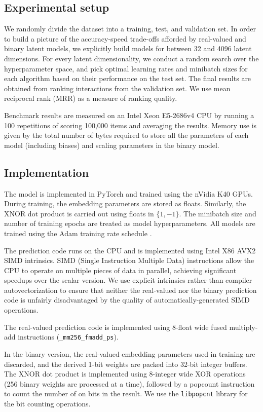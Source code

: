 \documentclass[sigchi]{acmart}
\begin{document}
\subsection{Experimental setup}
We randomly divide the dataset into a training, test, and validation set. In order to build a picture of the accuracy-speed trade-offs afforded by real-valued and binary latent models, we explicitly build models for between 32 and 4096 latent dimensions. For every latent dimensionality, we conduct a random search over the hyperparameter space, and pick optimal learning rates and minibatch sizes for each algorithm based on their performance on the test set. The final results are obtained from ranking interactions from the validation set. We use mean reciprocal rank (MRR) as a measure of ranking quality.

Benchmark results are measured on an Intel Xeon E5-2686v4 CPU by running a 100 repetitions of scoring 100,000 items and averaging the results. Memory use is given by the total number of bytes required to store all the parameters of each model (including biases) and scaling parameters in the binary model.

\subsection{Implementation}
The model is implemented in PyTorch and trained using the nVidia K40 GPUs. During training, the embedding parameters are stored as floats. Similarly, the XNOR dot product is carried out using floats in $\{1, -1\}$. The minibatch size and number of training epochs are treated as model hyperparameters. All models are trained using the Adam training rate schedule \citep{kingma2014adam}. 

The prediction code runs on the CPU and is implemented using Intel X86 AVX2 SIMD intrinsics. SIMD (Single Instruction Multiple Data) instructions allow the CPU to operate on multiple pieces of data in parallel, achieving significant speedups over the scalar version. We use explicit intrinsics rather than compiler autovectorization to ensure that neither the real-valued nor the binary prediction code is unfairly disadvantaged by the quality of automatically-generated SIMD operations.

The real-valued prediction code is implemented using 8-float wide fused multiply-add instructions (\texttt{\_mm256\_fmadd\_ps}).

In the binary version, the real-valued embedding parameters used in training are discarded, and the derived 1-bit weights are packed into 32-bit integer buffers. The XNOR dot product is implemented using 8-integer wide XOR operations (256 binary weights are processed at a time), followed by a popcount instruction to count the number of on bits in the result. We use the \texttt{libpopcnt} \citep{mula2016faster} library for the bit counting operations.
\end{document}
